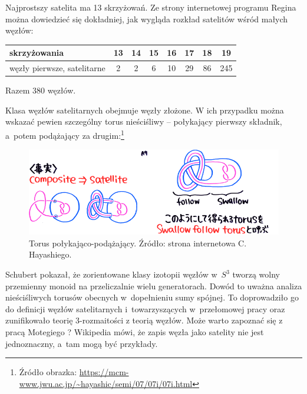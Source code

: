 Najprostszy satelita ma 13 skrzyżowań.
Ze strony internetowej programu Regina można dowiedzieć się dokładniej, jak wygląda rozkład satelitów wśród małych węzłów:

\renewcommand*{\arraystretch}{1.4}
\footnotesize
\begin{longtable}{lccccccc}
    \hline
    \textbf{skrzyżowania} & 13 & 14 & 15 & 16 & 17 & 18 & 19 \\ \hline \endhead
    węzły pierwsze, satelitarne & 2 & 2 & 6 & 10 & 29 & 86 & 245 \\
    \hline
\end{longtable}
\normalsize

Razem 380 węzłów.

\begin{example}
\label{swallow_follow_torus}
    Klasa węzłów satelitarnych obejmuje węzły złożone.
    W ich przypadku można wskazać pewien szczególny torus nieściśliwy -- połykający pierwszy składnik, a~potem podążający za drugim:\footnote{Źródło obrazka: \url{https://mcm-www.jwu.ac.jp/~hayashic/semi/07/07i/07i.html}}
    \begin{figure}[H]
        \centering
        \includegraphics[width=0.75\linewidth]{../data/mixed/follow-swallow.png}
        \caption[something]{Torus połykająco-podążający. Źródło: strona internetowa  C. Hayashiego.}
    \end{figure}
\end{example}

Schubert pokazał, że zorientowane klasy izotopii węzłów w~$S^3$ tworzą wolny przemienny monoid na przeliczalnie wielu generatorach.
%
Dowód to uważna analiza nieściśliwych torusów obecnych w~dopełnieniu sumy spójnej.
To doprowadziło go do definicji węzłów satelitarnych i~towarzyszących w~przełomowej pracy \cite{schubert1953} oraz zunifikowało teorię 3-rozmaitości z teorią węzłów.
Może warto zapoznać się z pracą Motegiego \cite{motegi1997}?
Wikipedia mówi, że zapis węzła jako satelity nie jest jednoznaczny, a~tam mogą być przykłady.

